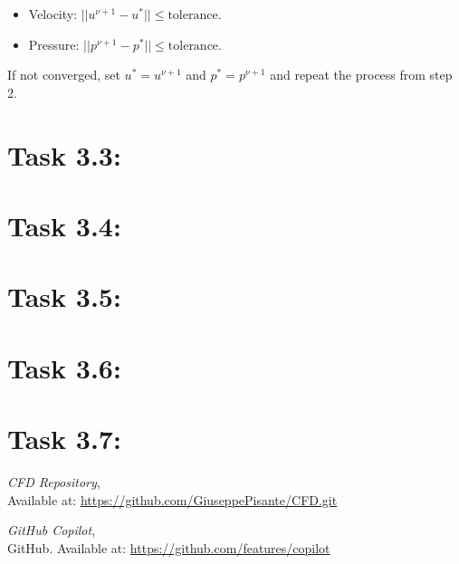 \documentclass{article}
\begin{document}
\begin{itemize}
  \item Velocity: $||u^{\nu+1} - u^*|| \leq \text{tolerance}$.
  \item Pressure: $||p^{\nu+1} - p^*|| \leq \text{tolerance}$.
\end{itemize}

If not converged, set $u^* = u^{\nu+1}$ and $p^* = p^{\nu+1}$ and repeat the process from step 2.

\section*{\Large Task 3.3:}
\section*{\Large Task 3.4:}
\section*{\Large Task 3.5:}
\section*{\Large Task 3.6:}
\section*{\Large Task 3.7:}

\begin{thebibliography}{9}
    \textit{CFD Repository},\\
    Available at: \url{https://github.com/GiuseppePisante/CFD.git}
    
    \textit{GitHub Copilot},\\
    GitHub. Available at: \url{https://github.com/features/copilot}
    \end{thebibliography}
\end{document}
